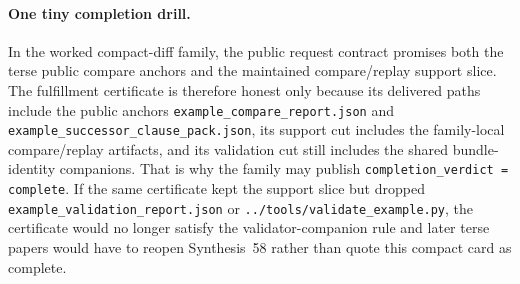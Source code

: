 \documentclass[11pt]{article}
\begin{document}
\paragraph{One tiny completion drill.}
In the worked compact-diff family, the public request contract promises both the terse public compare anchors and the maintained compare/replay support slice. The fulfillment certificate is therefore honest only because its delivered paths include the public anchors \texttt{example\_compare\_report.json} and \texttt{example\_successor\_clause\_pack.json}, its support cut includes the family-local compare/replay artifacts, and its validation cut still includes the shared bundle-identity companions. That is why the family may publish \texttt{completion\_verdict = complete}. If the same certificate kept the support slice but dropped \texttt{example\_validation\_report.json} or \nolinkurl{../tools/validate_example.py}, the certificate would no longer satisfy the validator-companion rule and later terse papers would have to reopen Synthesis~58 rather than quote this compact card as complete.\cite{series:workedexample}
\end{document}
